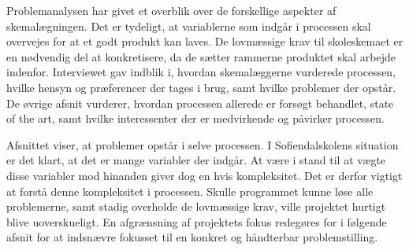 Problemanalysen har givet et overblik over de forskellige aspekter af skemalægningen. Det er tydeligt, at variablerne som indgår i processen skal overvejes for at et godt produkt kan laves. De lovmæssige krav til skoleskemaet er en nødvendig del at konkretisere, da de sætter rammerne produktet skal arbejde indenfor. Interviewet gav indblik i, hvordan skemalæggerne vurderede processen, hvilke hensyn og præferencer der tages i brug, samt hvilke problemer der opstår. De øvrige afsnit vurderer, hvordan processen allerede er forsøgt behandlet, state of the art, samt hvilke interessenter der er medvirkende og påvirker processen.

Afsnittet viser, at problemer opstår i selve processen. I Sofiendalskolens situation er det klart, at det er mange variabler der indgår. At være i stand til at vægte disse variabler mod hinanden giver dog en hvis kompleksitet. Det er derfor vigtigt at forstå denne kompleksitet i processen. Skulle programmet kunne løse alle problemerne, samt stadig overholde de lovmæssige krav, ville projektet hurtigt blive uoverskueligt. En afgrænsning af projektets fokus redegøres for i følgende afsnit for at indsnævre fokusset til en konkret og håndterbar problemstilling.
